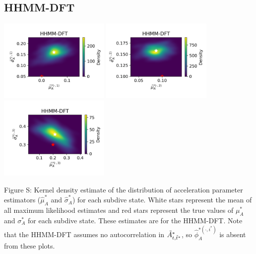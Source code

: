 \documentclass{article}
\begin{document}
        \subsection{HHMM-DFT}
        \begin{center}
        \includegraphics[width=2.1in]{../Plots/hhmm_FV_uncorr_MLE_density_A_0_0.png}
        \includegraphics[width=2.1in]{../Plots/hhmm_FV_uncorr_MLE_density_A_0_1.png}
        \includegraphics[width=2.1in]{../Plots/hhmm_FV_uncorr_MLE_density_A_0_2.png}
        \end{center}
        
        \noindent Figure S: Kernel density estimate of the distribution of acceleration parameter estimators ($\hat \mu^*_A$ and $\hat \sigma^*_A$) for each subdive state. White stars represent the mean of all maximum likelihood estimates and red stars represent the true values of $\mu^*_A$ and $\sigma^*_A$ for each subdive state. These estimates are for the HHMM-DFT. Note that the HHMM-DFT assumes no autocorrelation in $\tilde{A}^*_{t,\tilde t^*}$, so $\hat \phi_A^{*(\cdot,i^*)}$ is absent from these plots.
        \addtocounter{fignum}{1}
        
\end{document}
